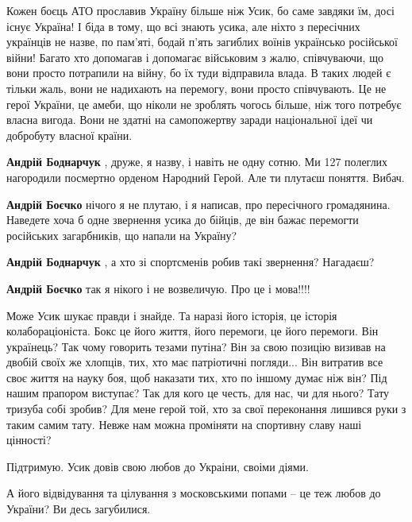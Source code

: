 \begin{itemize}

Кожен боєць АТО прославив Україну більше ніж Усик, бо саме завдяки їм, досі
існує Україна! І біда в тому, що всі знають усика, але ніхто з пересічних
українців не назве, по пам'яті, бодай п'ять загиблих воїнів українсько
російської війни! Багато хто допомагав і допомагає військовим з жалю,
співчуваючи, що вони просто потрапили на війну, бо їх туди відправила влада. В
таких людей є тільки жаль, вони не надихають на перемогу, вони просто
співчувають. Це не герої України, це амеби, що ніколи не зроблять чогось
більше, ніж того потребує власна вигода. Вони не здатні на самопожертву заради
національної ідеї чи добробуту власної країни.

\begin{itemize} %
\textbf{Андрій Боднарчук} , друже, я назву, і навіть не одну сотню. Ми 127 полеглих нагородили посмертно орденом Народний Герой. Але ти плутаєш поняття. Вибач.

\textbf{Андрій Боєчко} нічого я не плутаю, і я написав, про пересічного громадянина. Наведете хоча б одне звернення усика до бійців, де він бажає перемогти російських загарбників, що напали на Україну?


\textbf{Андрій Боднарчук} , а хто зі спортсменів робив такі звернення? Нагадаєш?

\textbf{Андрій Боєчко} так я нікого і не возвеличую. Про це і мова!!!!
\end{itemize} %


Може Усик шукає правди і знайде. Та наразі його історія, це історія
колабораціоніста. Бокс це його життя, його перемоги, це його перемоги. Він
українець? Так чому говорить тезами путіна? Він за свою позицію визивав на
двобій своїх же хлопців, тих, хто має патріотичні погляди... Він витратив все
своє життя на науку боя, щоб наказати тих, хто по іншому думає ніж він? Під
нашим прапором виступає? Так для кого це честь, для нас, чи для нього? Тату
тризуба собі зробив? Для мене герой той, хто за свої переконання лишився руки з
таким самим тату. Невже нам можна проміняти на спортивну славу наші цінності?

Підтримую. Усик довів свою любов до Украіни, своіми діями.

\begin{itemize} %
А його відвідування та цілування з московськими попами – це теж любов до України? Ви десь загубилися.


\end{itemize}
\end{itemize}
